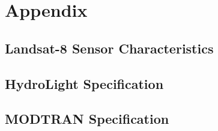 \appendix
\chapter*{Appendix}
\section{Landsat-8 Sensor Characteristics}
\section{HydroLight Specification}
\section{MODTRAN Specification}
